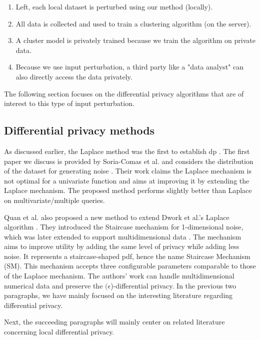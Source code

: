 \begin{enumerate}
  \item Left, each local dataset is perturbed using our method (locally).
  \item All data is collected and used to train a clustering algorithm (on the server).
  \item A cluster model is privately trained because we train the algorithm on private data.
  \item Because we use input perturbation, a third party like a "data analyst" can also directly access the data privately.
\end{enumerate}
The following section focuses on the differential privacy algorithms that are of interest to this type of input perturbation.

\newpage
\subsection{Differential privacy methods}
As discussed earlier, the Laplace method was the first to establish \gls{dp} \citep{dwork_differential_2006}.
The first paper we discuss is provided by Soria-Comas et al. and considers the distribution of the dataset for generating noise \citep{soria-comas_optimal_2013}.
Their work claims the Laplace mechanism is not optimal for a univariate function and aims at improving it by extending the Laplace mechanism.
The proposed method performs slightly better than Laplace on multivariate/multiple queries.

Quan et al. also proposed a new method to extend Dwork et al.'s Laplace algorithm \citep{geng_staircase_2015}.
They introduced the Staircase mechanism for 1-dimensional noise, which was later extended to support multidimensional data \citep{geng_staircase_2015}.
The mechanism aims to improve utility by adding the same level of privacy while adding less noise.
It represents a staircase-shaped \gls{pdf}, hence the name Staircase Mechanism (SM).
This mechanism accepts three configurable parameters comparable to those of the Laplace mechanism.
The authors' work can handle multidimensional numerical data and preserve the  $(\epsilon$)-differential privacy.
In the previous two paragraphs, we have mainly focused on the interesting literature regarding differential privacy.

Next, the succeeding paragraphs will mainly center on related literature concerning local differential privacy.

